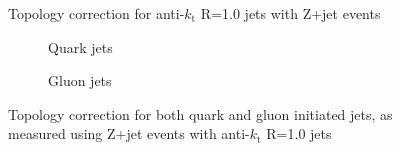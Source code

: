 \clearpage
\begin{figure}[!ht]
 \centering
 \caption[Topology correction for anti-$k_{\mathrm t}$ R=1.0 jets with Z+jet events]
 {\small Topology correction for anti-$k_{\mathrm t}$ R=1.0 jets with Z+jet events}
 \label{plot:ZJetTopoCorr10App}
\end{figure}

\begin{figure}[!ht]
 \centering
 \begin{subfigure}{.5\textwidth}
  \centering
  \caption{Quark jets}
 \end{subfigure}%
 \begin{subfigure}{.5\textwidth}
  \centering
  \caption{Gluon jets}
 \end{subfigure}
 \caption[Quark/gluon jet topology correction, anti-$k_{\mathrm t}$ R=1.0, Z+jet]
 {\small Topology correction for both quark and gluon initiated jets, as measured using Z+jet events with anti-$k_{\mathrm t}$ R=1.0 jets}
 \label{plot:ZJetTopoCorrFlav10App}
\end{figure}
